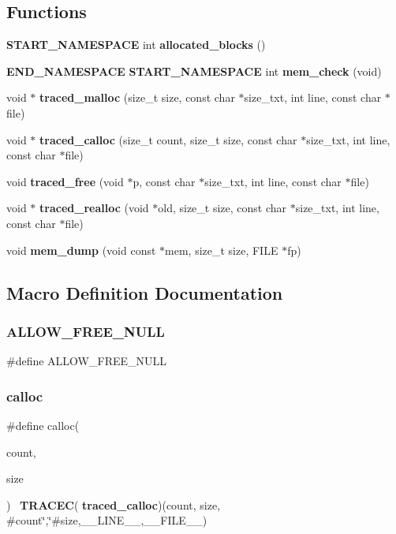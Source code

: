 \subsection*{Functions}
\begin{DoxyCompactItemize}
\item 
\textbf{ S\+T\+A\+R\+T\+\_\+\+N\+A\+M\+E\+S\+P\+A\+CE} int \textbf{ allocated\+\_\+blocks} ()
\item 
\textbf{ E\+N\+D\+\_\+\+N\+A\+M\+E\+S\+P\+A\+CE} \textbf{ S\+T\+A\+R\+T\+\_\+\+N\+A\+M\+E\+S\+P\+A\+CE} int \textbf{ mem\+\_\+check} (void)
\item 
void $\ast$ \textbf{ traced\+\_\+malloc} (size\+\_\+t size, const char $\ast$size\+\_\+txt, int line, const char $\ast$file)
\item 
void $\ast$ \textbf{ traced\+\_\+calloc} (size\+\_\+t count, size\+\_\+t size, const char $\ast$size\+\_\+txt, int line, const char $\ast$file)
\item 
void \textbf{ traced\+\_\+free} (void $\ast$p, const char $\ast$size\+\_\+txt, int line, const char $\ast$file)
\item 
void $\ast$ \textbf{ traced\+\_\+realloc} (void $\ast$old, size\+\_\+t size, const char $\ast$size\+\_\+txt, int line, const char $\ast$file)
\item 
void \textbf{ mem\+\_\+dump} (void const $\ast$mem, size\+\_\+t size, F\+I\+LE $\ast$fp)
\end{DoxyCompactItemize}


\subsection{Macro Definition Documentation}
\mbox{\label{memtrace_8h_af30a73f26c0085429afe8d13ccf255f5}} 
\subsubsection{A\+L\+L\+O\+W\+\_\+\+F\+R\+E\+E\+\_\+\+N\+U\+LL}
{\footnotesize\ttfamily \#define A\+L\+L\+O\+W\+\_\+\+F\+R\+E\+E\+\_\+\+N\+U\+LL}

\mbox{\label{memtrace_8h_ab98a612296b79e3e44d41727977b07a5}} 
\subsubsection{calloc}
{\footnotesize\ttfamily \#define calloc(\begin{DoxyParamCaption}\item[{}]{count,  }\item[{}]{size }\end{DoxyParamCaption})~\textbf{ T\+R\+A\+C\+EC}(\textbf{ traced\+\_\+calloc})(count, size, \#count\char`\"{},\char`\"{}\#size,\+\_\+\+\_\+\+L\+I\+N\+E\+\_\+\+\_\+,\+\_\+\+\_\+\+F\+I\+L\+E\+\_\+\+\_\+)}

